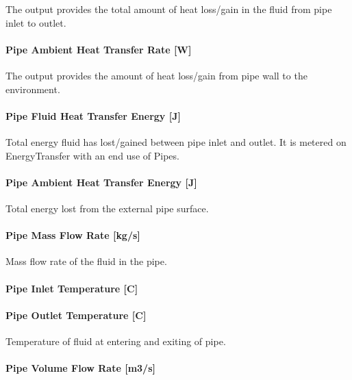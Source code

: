 The output provides the total amount of heat loss/gain in the fluid from pipe inlet to outlet.

\paragraph{Pipe Ambient Heat Transfer Rate {[}W{]}}\label{pipe-ambient-heat-transfer-rate-w}

The output provides the amount of heat loss/gain from pipe wall to the environment.

\paragraph{Pipe Fluid Heat Transfer Energy {[}J{]}}\label{pipe-fluid-heat-transfer-energy-j}

Total energy fluid has lost/gained between pipe inlet and outlet. It is metered on EnergyTransfer with an end use of Pipes.

\paragraph{Pipe Ambient Heat Transfer Energy {[}J{]}}\label{pipe-ambient-heat-transfer-energy-j}

Total energy lost from the external pipe surface.

\paragraph{Pipe Mass Flow Rate {[}kg/s{]}}\label{pipe-mass-flow-rate-kgs}

Mass flow rate of the fluid in the pipe.

\paragraph{Pipe Inlet Temperature {[}C{]}}\label{pipe-inlet-temperature-c}

\paragraph{Pipe Outlet Temperature {[}C{]}}\label{pipe-outlet-temperature-c}

Temperature of fluid at entering and exiting of pipe.

\paragraph{Pipe Volume Flow Rate {[}m3/s{]}}\label{pipe-volume-flow-rate-m3s}

